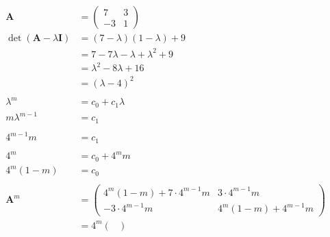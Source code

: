 \documentclass{article}
\begin{document}
\begin{align*}
  \mathbf{A}                             & = \begin{pmatrix}
                                               7  & 3 \\
                                               -3 & 1
                                             \end{pmatrix}                                                \\
  \det (\mathbf{A} - \lambda \mathbf{I}) & = (7 - \lambda) (1 - \lambda) + 9                               \\
                                         & = 7 - 7 \lambda - \lambda + \lambda^2 + 9                       \\
                                         & = \lambda^2 - 8 \lambda + 16                                    \\
                                         & = (\lambda - 4)^2                                               \\ \\
  \lambda^m                              & = c_0 + c_1 \lambda                                             \\
  m \lambda^{m - 1}                      & = c_1                                                           \\ \\
  4^{m - 1} m                            & = c_1                                                           \\ \\
  4^m                                    & = c_0 + 4^m m                                                   \\
  4^m (1 - m)                            & = c_0                                                           \\ \\
  \mathbf{A}^m                           & = \begin{pmatrix}
                                               4^m (1 - m) + 7 \cdot 4^{m - 1} m & 3 \cdot 4^{m - 1} m       \\
                                               -3 \cdot 4^{m - 1} m              & 4^m (1 - m) + 4^{m - 1} m
                                             \end{pmatrix} \\
                                         & = 4^m \begin{pmatrix}

\end{pmatrix}
\end{align*}
\end{document}
